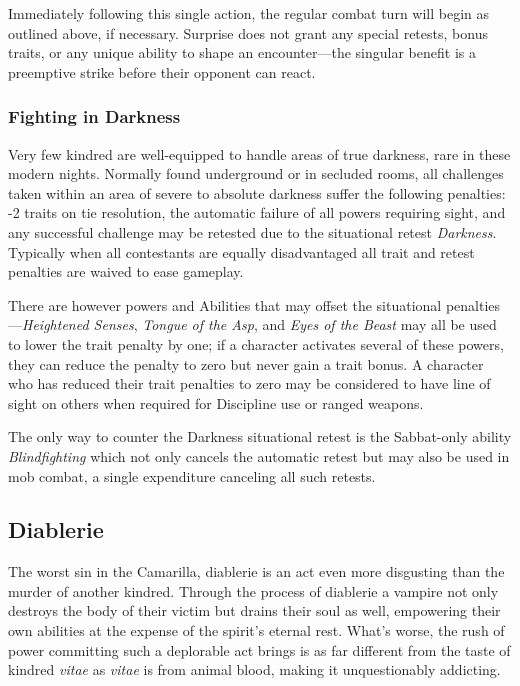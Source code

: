 Immediately following this single action, the regular combat turn will begin as outlined above, if 
necessary.  Surprise does not grant any special retests, bonus traits, or any unique ability to 
shape an encounter---the singular benefit is a preemptive strike before their opponent can react.

\subsubsection{Fighting in Darkness}
Very few kindred are well-equipped to handle areas of true darkness, rare in these modern nights.  
Normally found underground or in secluded rooms, all challenges taken within an area of severe to 
absolute darkness suffer the following penalties:  -2 traits on tie resolution, the automatic 
failure of all powers requiring sight, and any successful challenge may be retested due to the 
situational retest \emph{Darkness}.  Typically when all contestants are equally disadvantaged 
all trait and retest penalties are waived to ease gameplay.

There are however powers and Abilities that may offset the situational penalties---\emph{Heightened 
Senses}, \emph{Tongue of the Asp}, and \emph{Eyes of the Beast} may all be used to lower the trait 
penalty by one; if a character activates several of these powers, they can reduce the penalty to zero 
but never gain a trait bonus.  A character who has reduced their trait penalties to zero may be 
considered to have line of sight on others when required for Discipline use or ranged weapons.

The only way to counter the Darkness situational retest is the Sabbat-only ability \emph{Blindfighting} 
which not only cancels the automatic retest but may also be used in mob combat, a single expenditure 
canceling all such retests. 

\subsection{Diablerie}
The worst sin in the Camarilla, diablerie is an act even more disgusting than the murder of 
another kindred.  Through the process of diablerie a vampire not only destroys the body of 
their victim but drains their soul as well, empowering their own abilities at the expense of 
the spirit's eternal rest.  What's worse, the rush of power committing such a deplorable act 
brings is as far different from the taste of kindred \emph{vitae} as \emph{vitae} is from 
animal blood, making it unquestionably addicting.

